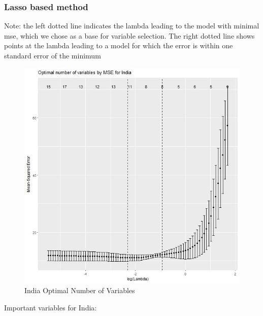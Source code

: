 \documentclass[11pt]{article}
\begin{document}
\newpage
\subsubsection{Lasso based method}

Note: the left dotted line indicates the lambda leading to the model with minimal mse, which we chose as a base for variable selection. The right dotted line shows points at the lambda leading to a model for which the error is within one standard error of the minimum

\FloatBarrier
\begin{figure}[!htb]
\begin{center}
\includegraphics[scale=0.85]{L1.jpg}
\caption{India Optimal Number of Variables}
\label{figure9}
\end{center}
\end{figure}
\FloatBarrier

Important variables for India:
\end{document}
